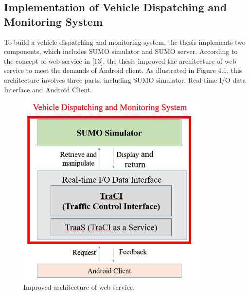 \documentclass[12pt]{ksthesis}
\begin{document}
\begin{thesis}
{\chapter{Implementation of Vehicle Dispatching and Monitoring System }\label{Chap:Architecture}

To build a vehicle dispatching and monitoring system, the thesis implements two components, which includes SUMO simulator and SUMO server. According to the concept of web service in [13], the thesis improved the architecture of web service to meet the demands of Android client.
As illustrated in Figure 4.1, this architecture involves three parts, including SUMO simulator, Real-time I/O data Interface and Android Client.

\begin{figure}[t!]
\centering
\includegraphics[width=0.85\textwidth]{./Thesis_figures/F4-1_webService_arcitecture.PNG}
\caption{\large Improved architecture of web service.}
\vspace{0.5cm}
\label{Fig:Improved_architecture_of_web_service}
\end{figure}



}
\end{thesis}
\end{document}
